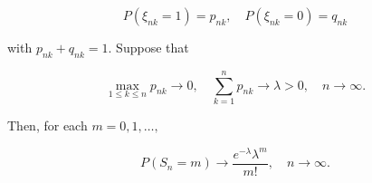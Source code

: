 $$P(\xi_{nk} = 1) = p_{nk}, \quad P(\xi_{nk} = 0) = q_{nk}$$

with $p_{nk} + q_{nk} = 1$. Suppose that

$$\max_{1 \leq k \leq n} p_{nk} \to 0, \quad \sum_{k=1}^{n} p_{nk} \to \lambda > 0, \quad n \to \infty.$$

Then, for each $m = 0, 1, \ldots,$

$$P(S_n = m) \to \frac{e^{-\lambda} \lambda^m}{m!}, \quad n \to \infty.$$
